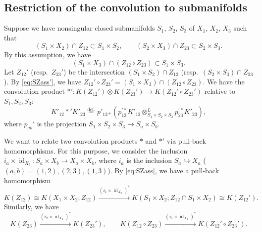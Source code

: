 \documentclass[12pt]{amsart}
\theoremstyle{definition}
\theoremstyle{remark}
\numberwithin{equation}{subsection}
\newcommand{\defeq}{\overset{\operatorname{\scriptstyle def.}}{=}}
\newcommand{\id}{\operatorname{id}}
\begin{document}
\subsection{Restriction of the convolution to submanifolds}
Suppose we have nonsingular closed submanifolds $S_1$, $S_2$, $S_3$ of
$X_1$, $X_2$, $X_3$ such that
\begin{equation}\label{eq:SZass}
  \left(S_1\times X_2\right) \cap Z_{12} \subset S_1\times S_2, \qquad
  \left(S_2\times X_3\right) \cap Z_{23} \subset S_2\times S_3.
\end{equation}
By this assumption, we have
\begin{equation}\label{eq:SZass'}
  (S_1\times X_3)\cap (Z_{12}\circ Z_{23}) \subset S_1\times S_3.
\end{equation}
Let $Z_{12}'$ (resp.\ $Z_{23}'$) be the intersection $(S_1\times
S_2)\cap Z_{12}$ (resp.\ $(S_2\times S_3)\cap Z_{23}$). By
\eqref{eq:SZass'}, we have $Z_{12}'\circ Z_{23}' =
(S_1\times X_3)\cap (Z_{12}\circ Z_{23})$.
%
We have the convolution product $\ast'\colon K(Z_{12}')\otimes
K(Z_{23}') \to K(Z_{12}'\circ Z_{23}')$ relative to $S_1, S_2, S_3$:
\begin{equation*}
  K'_{12}*' K'_{23}
  \defeq p'_{13*} \left(
  p_{12}^{\prime *} K'_{12}\otimes^L_{S_1\times S_2\times S_3}
  p_{23}^{\prime *} K'_{23}\right),
\end{equation*}
where $p_{ab}'$ is the projection
$S_1\times S_2\times S_3\to S_a\times S_b$.

We want to relate two convolution products $*$ and $*'$ via pull-back
homomorphisms. For this purpose, we consider the inclusion
$i_a\times\id_{X_b}\colon S_a\times X_b\to X_a\times X_b$,
where $i_a$ is the inclusion $S_a\hookrightarrow X_a$
($(a,b) = (1,2), (2,3), (1,3)$). By \eqref{eq:SZass}, we have
a pull-back homomorphism
\begin{equation*}
  K(Z_{12})\cong K(X_1\times X_2; Z_{12}) 
  \xrightarrow{(i_1\times\id_{X_2})^*}
  K(S_1\times X_2; Z_{12}\cap S_1\times X_2) \cong K(Z_{12}').
\end{equation*}
Similarly, we have
\begin{equation*}
  K(Z_{23})\xrightarrow{(i_2\times\id_{X_3})^*}
  K(Z_{23}'), \qquad
  K(Z_{12}\circ Z_{23})\xrightarrow{(i_1\times\id_{X_3})^*}
  K(Z_{12}'\circ Z_{23}').
\end{equation*}
\end{document}
